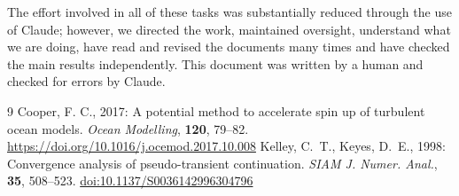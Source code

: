 \documentclass{article}
\begin{document}
The effort involved in all of these tasks was substantially reduced through the use of Claude; however, we directed the work, maintained oversight, understand what we are doing, have read and revised the documents many times and have checked the main results independently. This document was written by a human and checked for errors by Claude.

\begin{thebibliography}{9}
 Cooper, F. C., 2017: A potential method to accelerate spin up of turbulent ocean models. \textit{Ocean Modelling}, \textbf{120}, 79--82. \url{https://doi.org/10.1016/j.ocemod.2017.10.008}
 Kelley, C.~T., Keyes, D.~E., 1998: Convergence analysis of pseudo-transient continuation. \textit{SIAM J. Numer. Anal.}, \textbf{35}, 508--523. \href{https://doi.org/10.1137/S0036142996304796}{doi:10.1137/S0036142996304796}
\end{thebibliography}
\end{document}

